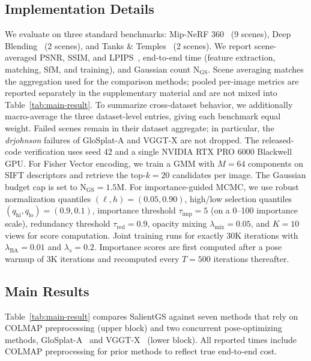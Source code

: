 \documentclass[sigconf]{acmart}
\begin{document}
\subsection{Implementation Details}
\label{sec:impl_details}

We evaluate on three standard benchmarks: Mip-NeRF 360~\cite{barron2022mip} (9 scenes), Deep Blending~\cite{hedman2018deep} (2 scenes), and Tanks \& Temples~\cite{knapitsch2017tanks} (2 scenes). We report scene-averaged PSNR, SSIM, and LPIPS~\cite{zhang2018unreasonable}, end-to-end time (feature extraction, matching, SfM, and training), and Gaussian count $\mathrm{N_{GS}}$. Scene averaging matches the aggregation used for the comparison methods; pooled per-image metrics are reported separately in the supplementary material and are not mixed into Table~\ref{tab:main-result}. To summarize cross-dataset behavior, we additionally macro-average the three dataset-level entries, giving each benchmark equal weight. Failed scenes remain in their dataset aggregate; in particular, the \textit{drjohnson} failures of GloSplat-A and VGGT-X are not dropped. The released-code verification uses seed 42 and a single NVIDIA RTX PRO 6000 Blackwell GPU. For Fisher Vector encoding, we train a GMM with $M{=}64$ components on SIFT descriptors and retrieve the top-$k{=}20$ candidates per image. The Gaussian budget cap is set to $\mathrm{N_{GS}}{=}1.5$M. For importance-guided MCMC, we use robust normalization quantiles $(\ell,h){=}(0.05,0.90)$, high/low selection quantiles $(q_{\text{hi}},q_{\text{lo}}){=}(0.9,0.1)$, importance threshold $\tau_{\text{imp}}{=}5$ (on a 0--100 importance scale), redundancy threshold $\tau_{\text{red}}{=}0.9$, opacity mixing $\lambda_{\text{mix}}{=}0.05$, and $K{=}10$ views for score computation. Joint training runs for exactly 30K iterations with $\lambda_{\text{BA}}{=}0.01$ and $\lambda_s{=}0.2$. Importance scores are first computed after a pose warmup of 3K iterations and recomputed every $T{=}500$ iterations thereafter.

\subsection{Main Results}
\label{sec:main_results}

Table~\ref{tab:main-result} compares SalientGS against seven methods that rely on COLMAP preprocessing (upper block) and two concurrent pose-optimizing methods, GloSplat-A~\cite{glosplat} and VGGT-X~\cite{wang2025vggt} (lower block). All reported times include COLMAP preprocessing for prior methods to reflect true end-to-end cost.
\end{document}
